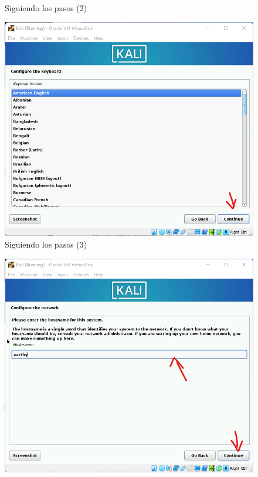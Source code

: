 \documentclass[stu, 12pt, letterpaper, donotrepeattitle, floatsintext, natbib, helv]{apa7}
\begin{document}
\begin{enumerate}
\begin{figure} [H]
        \caption{Siguiendo los pasos (2)}
        \label{fig:Inst2}
    \end{figure}
    \begin{figure} [H]
        \includegraphics[width = 1\textwidth]{Installation3.png}
        \caption{Siguiendo los pasos (3)}
        \label{fig:Inst3}
    \end{figure}
    \begin{figure} [H]
        \includegraphics[width = 1\textwidth]{Installation4.png}

\end{figure}
\end{enumerate}
\end{document}

